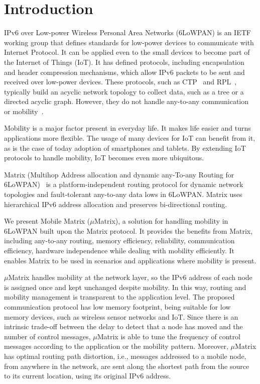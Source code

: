 \section{Introduction}
\label{sec:intro}

IPv6 over Low-power Wireless Personal Area Networks (6LoWPAN) is an IETF working group that defines standards for low-power devices to communicate with Internet Protocol. It can be applied even to the small devices to become part of the Internet of Things (IoT). It has defined protocols, including encapsulation and header compression mechanisms, which allow IPv6 packets to be sent and received over low-power devices. These protocols, such as CTP~\cite{ctptosn2014} and RPL~\cite{rfc6550}, typically build an acyclic network topology to collect data, such as a tree or a directed acyclic graph. However, they do not handle any-to-any communication or mobility~\cite{iova2016rpl}.

Mobility is a major factor present in everyday life. It makes life easier and turns applications more flexible. The usage of many devices for IoT can benefit from it, as is the case of today adoption of smartphones and tablets. By extending IoT protocols to handle mobility, IoT becomes even more ubiquitous.  

Matrix (Multihop Address allocation and dynamic
any-To-any Routing for 6LoWPAN)~\cite{Peres:2016} is a platform-independent routing
protocol for dynamic network topologies and fault-tolerant
any-to-any data lows in 6LoWPAN. Matrix uses hierarchical IPv6 address allocation and preserves bi-directional routing. 

We present Mobile Matrix ($\mu$Matrix), a solution for handling mobility in 6LoWPAN built upon the Matrix protocol. It provides the benefits from Matrix, including any-to-any routing, memory efficiency, reliability, communication efficiency, hardware independence while dealing with mobility efficiently. It enables Matrix to be used in scenarios and applications where mobility is present. 

$\mu$Matrix handles mobility at the network layer, so the IPv6 address of each node is assigned once and kept unchanged despite mobility. In this way, routing and mobility management is transparent to the application level. The proposed communication protocol has low memory footprint, being suitable for low memory devices, such as wireless sensor networks and IoT. Since there is an intrinsic trade-off between the delay to detect that a node has moved and the number of control messages, $\mu$Matrix is able to tune the frequency of control messages according to the application or the mobility pattern. Moreover, $\mu$Matrix has optimal routing path distortion, i.e., messages addressed to a mobile node, from anywhere in the network, are sent along the shortest path from the source to its current location, using its original IPv6 address.

